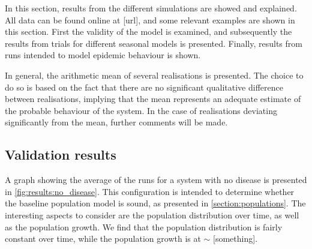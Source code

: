 \documentclass[10pt,a4paper]{article}
\begin{document}
In this section, results from the different simulations are showed and explained. All data can be found online at [url], and some relevant examples are shown in this section. First the validity of the model is examined, and subsequently the results from trials for different seasonal models is presented. Finally, results from runs intended to model epidemic behaviour is shown.

In general, the arithmetic mean of several realisations is presented. The choice to do so is based on the fact that there are no significant qualitative difference between realisations, implying that the mean represents an adequate estimate of the probable behaviour of the system. In the case of realisations deviating significantly from the mean, further comments will be made.

\subsection{Validation results}

A graph showing the average of the runs for a system with no disease is presented in \cref{fig:results:no_disease}. This configuration is intended to determine whether the baseline population model is sound, as presented in \cref{section:populations}. The interesting aspects to consider are the population distribution over time, as well as the population growth. We find that the population distribution is fairly constant over time, while the population growth is at $\sim$ [something].
\end{document}
